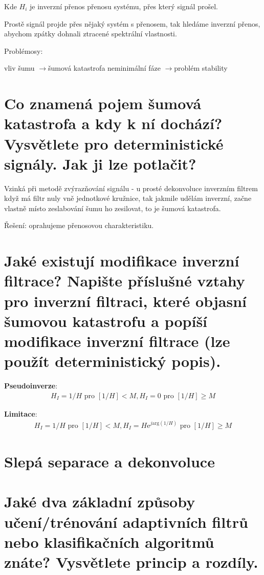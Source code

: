 \documentclass[a4paper,12pt]{article}   %
\newcommand{\rrarr}{$\rightarrow$}
\newcommand{\mt}[1]{$#1$}
\newcommand{\e}{\text{e}}
\newcommand{\okruh}[1]{\section*{\Large #1}}
\begin{document}
Kde \mt{H_i} je inverzní přenos přenosu systému, přes který signál prošel.

Prostě signál projde přes nějaký systém s přenosem, tak hledáme inverzní přenos, abychom zpátky dohnali ztracené spektrální vlastnosti. 

Problémosy:
\begin{outline}
        \1 vliv šumu \rrarr šumová katastrofa
        \1 neminimální fáze \rrarr problém stability
\end{outline}



\section{Co znamená pojem šumová katastrofa a kdy k ní dochází? Vysvětlete pro deterministické signály. Jak ji lze potlačit?}

Vzinká při metodě zvýrazňování signálu - u prosté dekonvoluce inverzním filtrem
když má filtr nuly vně jednotkové kružnice, tak jakmile udělám inverzní, začne vlastně místo zeslabování šumu ho zesilovat, to je šumová katastrofa.

Řešení: oprahujeme přenosovou charakteristiku.


\section{Jaké existují modifikace inverzní filtrace? Napište příslušné vztahy pro inverzní filtraci, které objasní šumovou katastrofu a popíší modifikace inverzní filtrace (lze použít deterministický popis).}
\textbf{Pseudoinverze}:
\begin{align*}
        H_I = 1/H \text{ pro } [1/H] < M, H_I = 0 \text{ pro } [1/H] \geq M 
\end{align*}

\textbf{Limitace}:
\begin{align*}
        H_I = 1/H \text{ pro } [1/H] < M, H_I = H\e^{j\text{arg}(1/H)} \text{ pro } [1/H] \geq M
\end{align*}




\clearpage

\okruh{Slepá separace a dekonvoluce}

\section{Jaké dva základní způsoby učení/trénování adaptivních filtrů nebo klasifikačních algoritmů znáte? Vysvětlete princip a rozdíly.}
\end{document}
